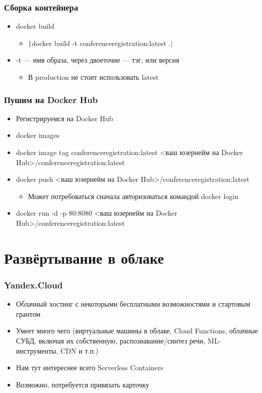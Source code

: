 \documentclass{../../slides-style}
\begin{document}
    \begin{frame}
        \frametitle{Сборка контейнера}
        \begin{itemize}
            \item docker build
            \begin{itemize}
                \item \texttt|docker build -t conferenceregistration:latest .|
            \end{itemize}
            \item -t --- имя образа, через двоеточие --- тэг, или версия
            \begin{itemize}
                \item В production не стоит использовать latest
            \end{itemize}
        \end{itemize}
    \end{frame}

    \begin{frame}[fragile]
        \frametitle{Пушим на Docker Hub}
        \begin{itemize}
            \item Регистрируемся на Docker Hub
            \item docker images
            \item docker image tag conferenceregistration:latest <ваш юзернейм на Docker Hub>/conferenceregistration:latest
            \item docker push <ваш юзернейм на Docker Hub>/conferenceregistration:latest
            \begin{itemize}
                \item Может потребоваться сначала авторизоваться командой docker login
            \end{itemize}
            \item docker run -d -p 80:8080 <ваш юзернейм на Docker Hub>/conferenceregistration:latest
        \end{itemize}
    \end{frame}

    \section{Развёртывание в облаке}

    \begin{frame}
        \frametitle{Yandex.Cloud}
        \begin{itemize}
            \item Облачный хостинг с некоторыми бесплатными возможностями и стартовым грантом
            \item Умеет много чего (виртуальные машины в облаке, Cloud Functions, облачные СУБД, включая их собственную, распознавание/синтез речи, ML-инструменты, CDN и т.п.)
            \item Нам тут интереснее всего Serverless Containers
            \item Возможно, потребуется привязать карточку
        \end{itemize}
    \end{frame}
\end{document}
